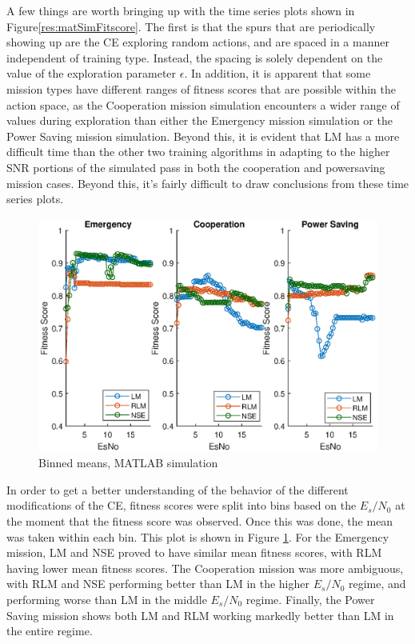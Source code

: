 
\par A few things are worth bringing up with the time series plots shown in Figure\ref{res:matSimFitscore}. The first is that the spurs that are periodically showing up are the CE exploring random actions, and are spaced in a manner independent of training type. Instead, the spacing is solely dependent on the value of the exploration parameter $\epsilon$. In addition, it is apparent that some mission types have different ranges of fitness scores that are possible within the action space, as the Cooperation mission simulation encounters a wider range of values during exploration than either the Emergency mission simulation or the Power Saving mission simulation. Beyond this, it is evident that LM has a more difficult time than the other two training algorithms in adapting to the higher SNR portions of the simulated pass in both the cooperation and powersaving mission cases. Beyond this, it's fairly difficult to draw conclusions from these time series plots.
\begin{figure}[!ht]
\centering
\includegraphics[width=\linewidth]{figures/matlab_sim_results/binnedMeans_sim.eps}
\caption{Binned means, MATLAB simulation}
\label{res:matSimBinMean}
\end{figure}
\par In order to get a better understanding of the behavior of the different modifications of the CE, fitness scores were split into bins based on the $E_s/N_0$ at the moment that the fitness score was observed. Once this was done, the mean was taken within each bin. This plot is shown in Figure \ref{res:matSimBinMean}. For the Emergency mission, LM and NSE proved to have similar mean fitness scores, with RLM having lower mean fitness scores. The Cooperation mission was more ambiguous, with RLM and NSE performing better than LM in the higher $E_s/N_0$ regime, and performing worse than LM in the middle $E_s/N_0$ regime. Finally, the Power Saving mission shows both LM and RLM working markedly better than LM in the entire regime.

